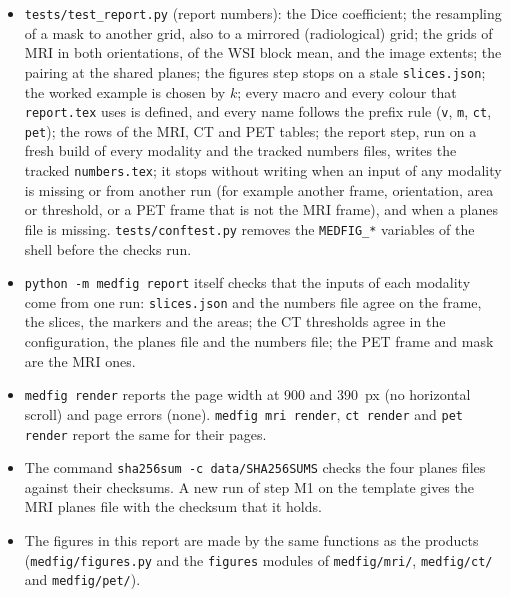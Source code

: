 \documentclass[10pt,a4paper]{article}
\newcommand{\code}[1]{\texttt{#1}}
\begin{document}
\begin{itemize}
the same $y$, and so do the markers; two builds give byte-identical SVGs; the SVGs equal the reference copies
(\code{tests/reference/pet/<series>/}, made on 14 October 2026); a wrong palette, edges that do not ascend, an unknown series
channel, a missing $y$ or an unknown orientation stop the step; the colour key, the pages and the thumbnails; the reference
mean on synthetic volumes (a constant, a linear uptake on another grid, points outside the field of view) and
\code{pet extract}; the command line.
\item \code{tests/test\_report.py} (report numbers): the Dice coefficient; the resampling of a mask to another grid, also to
a mirrored (radiological) grid; the grids of MRI in both orientations, of the WSI block mean, and the image extents; the pairing
at the shared planes; the figures step stops on a stale \code{slices.json}; the worked example is chosen by $k$; every macro
and every colour that \code{report.tex} uses is defined, and every name follows the prefix rule (\code{v}, \code{m},
\code{ct}, \code{pet}); the rows of the MRI, CT and PET tables; the report step, run on a fresh build of every modality and the
tracked numbers files, writes the tracked \code{numbers.tex}; it stops without writing when an input of any modality is
missing or from another run (for example another frame, orientation, area or threshold, or a PET frame that is not the MRI
frame), and when a planes file is missing. \code{tests/conftest.py} removes the \code{MEDFIG\_*} variables of the shell
before the checks run.
\item \code{python -m medfig report} itself checks that the inputs of each modality come from one run: \code{slices.json} and
the numbers file agree on the frame, the slices, the markers and the areas; the CT thresholds agree in the configuration, the
planes file and the numbers file; the PET frame and mask are the MRI ones.
\item \code{medfig render} reports the page width at 900 and 390~px (no horizontal scroll) and page errors (none).
\code{medfig mri render}, \code{ct render} and \code{pet render} report the same for their pages.
\item The command \code{sha256sum -c data/SHA256SUMS} checks the four planes files against their checksums. A new run
of step M1 on the template gives the MRI planes file with the checksum that it holds.
\item The figures in this report are made by the same functions as the products (\code{medfig/figures.py} and the
\code{figures} modules of \code{medfig/mri/}, \code{medfig/ct/} and \code{medfig/pet/}).
\end{itemize}
\end{document}
